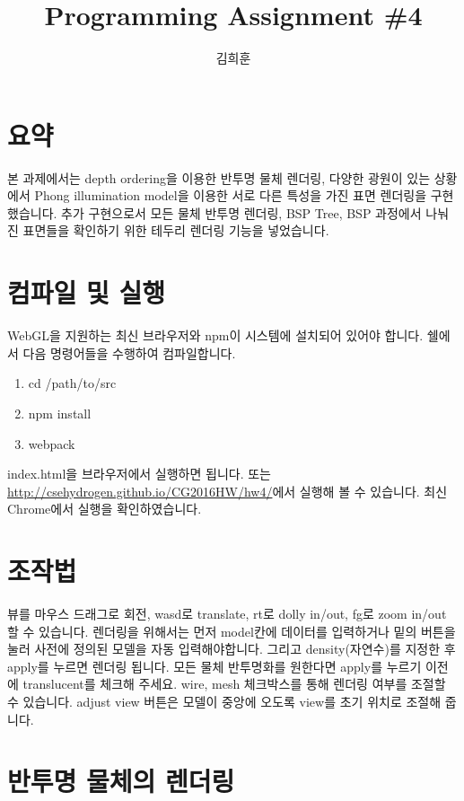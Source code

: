 \documentclass{article}
\begin{document}
\title{Programming Assignment \#4}
\author{김희훈}
\maketitle

\section{요약}

본 과제에서는 depth ordering을 이용한 반투명 물체 렌더링, 다양한 광원이 있는 상황에서 Phong illumination model을 이용한 서로 다른 특성을 가진 표면 렌더링을 구현했습니다.
추가 구현으로서 모든 물체 반투명 렌더링, BSP Tree, BSP 과정에서 나눠진 표면들을 확인하기 위한 테두리 렌더링 기능을 넣었습니다.

\section{컴파일 및 실행}

WebGL을 지원하는 최신 브라우저와 npm이 시스템에 설치되어 있어야 합니다.
쉘에서 다음 명령어들을 수행하여 컴파일합니다.

\begin{enumerate}
  \item cd /path/to/src
  \item npm install
  \item webpack
\end{enumerate}

index.html을 브라우저에서 실행하면 됩니다.
또는 \url{http://csehydrogen.github.io/CG2016HW/hw4/}에서 실행해 볼 수 있습니다.
최신 Chrome에서 실행을 확인하였습니다.

\section{조작법}

뷰를 마우스 드래그로 회전, wasd로 translate, rt로 dolly in/out, fg로 zoom in/out 할 수 있습니다.
렌더링을 위해서는 먼저 model칸에 데이터를 입력하거나 밑의 버튼을 눌러 사전에 정의된 모델을 자동 입력해야합니다.
그리고 density(자연수)를 지정한 후 apply를 누르면 렌더링 됩니다.
모든 물체 반투명화를 원한다면 apply를 누르기 이전에 translucent를 체크해 주세요.
wire, mesh 체크박스를 통해 렌더링 여부를 조절할 수 있습니다.
adjust view 버튼은 모델이 중앙에 오도록 view를 초기 위치로 조절해 줍니다.

\section{반투명 물체의 렌더링}
\end{document}
